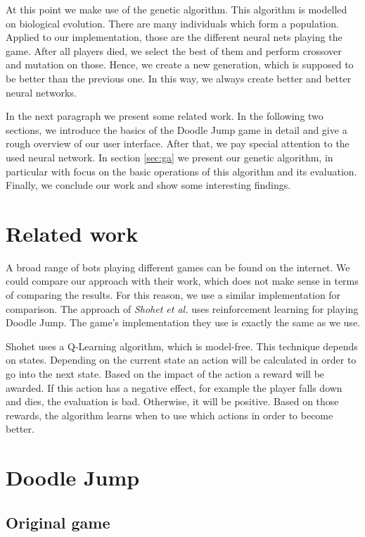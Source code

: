 \documentclass[a4paper,12pt,pagesize,headsepline,bibtotoc,titlepage,abstracton]{scrartcl}
\begin{document}
At this point we make use of the genetic algorithm. This algorithm is modelled on biological evolution. There are many individuals which form a population. Applied to our implementation, those are the different neural nets playing the game. After all players died, we select the best of them and perform crossover and mutation on those. Hence, we create a new generation, which is supposed to be better than the previous one. In this way, we always create better and better neural networks.

In the next paragraph we present some related work. In the following two sections, we introduce the basics of the Doodle Jump game in detail and give a rough overview of our user interface. After that, we pay special attention to the used neural network. In section \ref{sec:ga} we present our genetic algorithm, in particular with focus on the basic operations of this algorithm and its evaluation. Finally, we conclude our work and show some interesting findings.


\section{Related work}
\label{sec:rw}

A broad range of bots playing different games can be found on the internet. We could compare our approach with their work, which does not make sense in terms of comparing the results. For this reason, we use a similar implementation for comparison. The approach of \textit{Shohet et al.}\cite{eshohet} uses reinforcement learning for playing Doodle Jump. The game's implementation they use is exactly the same as we use.

Shohet uses a Q-Learning algorithm, which is model-free. This technique depends on states. Depending on the current state an action will be calculated in order to go into the next state. Based on the impact of the action a reward will be awarded. If this action has a negative effect, for example the player falls down and dies, the evaluation is bad. Otherwise, it will be positive. Based on those rewards, the algorithm learns when to use which actions in order to become better.

\section{Doodle Jump}
\subsection{Original game}
\label{sec:og}
\end{document}

